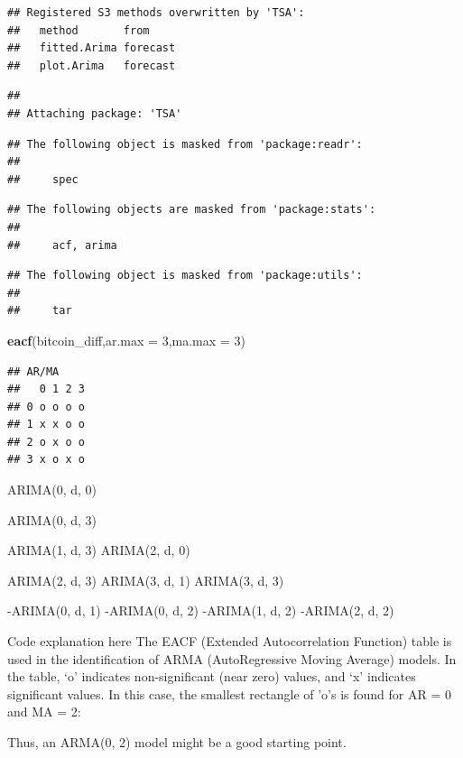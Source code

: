 \documentclass[
]{book}
\newenvironment{Shaded}{\begin{snugshade}}{\end{snugshade}}
\newcommand{\AttributeTok}[1]{\textcolor[rgb]{0.13,0.29,0.53}{#1}}
\newcommand{\DecValTok}[1]{\textcolor[rgb]{0.00,0.00,0.81}{#1}}
\newcommand{\FunctionTok}[1]{\textcolor[rgb]{0.13,0.29,0.53}{\textbf{#1}}}
\newcommand{\NormalTok}[1]{#1}
\begin{document}
\begin{verbatim}
## Registered S3 methods overwritten by 'TSA':
##   method       from    
##   fitted.Arima forecast
##   plot.Arima   forecast
\end{verbatim}

\begin{verbatim}
## 
## Attaching package: 'TSA'
\end{verbatim}

\begin{verbatim}
## The following object is masked from 'package:readr':
## 
##     spec
\end{verbatim}

\begin{verbatim}
## The following objects are masked from 'package:stats':
## 
##     acf, arima
\end{verbatim}

\begin{verbatim}
## The following object is masked from 'package:utils':
## 
##     tar
\end{verbatim}

\begin{Shaded}
\begin{Highlighting}[]
\FunctionTok{eacf}\NormalTok{(bitcoin\_diff,}\AttributeTok{ar.max =} \DecValTok{3}\NormalTok{,}\AttributeTok{ma.max =} \DecValTok{3}\NormalTok{)}
\end{Highlighting}
\end{Shaded}

\begin{verbatim}
## AR/MA
##   0 1 2 3
## 0 o o o o
## 1 x x o o
## 2 o x o o
## 3 x o x o
\end{verbatim}

ARIMA(0, d, 0)

ARIMA(0, d, 3)

ARIMA(1, d, 3)
ARIMA(2, d, 0)

ARIMA(2, d, 3)
ARIMA(3, d, 1)
ARIMA(3, d, 3)

-ARIMA(0, d, 1)
-ARIMA(0, d, 2)
-ARIMA(1, d, 2)
-ARIMA(2, d, 2)

Code explanation here
The EACF (Extended Autocorrelation Function) table is used in the identification of ARMA (AutoRegressive Moving Average) models. In the table, `o' indicates non-significant (near zero) values, and `x' indicates significant values.
In this case, the smallest rectangle of 'o's is found for AR = 0 and MA = 2:

Thus, an ARMA(0, 2) model might be a good starting point.
\end{document}
